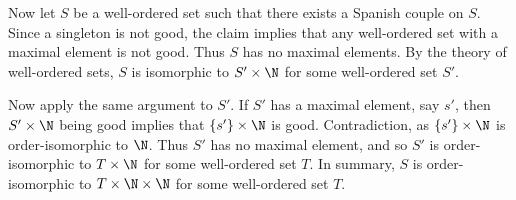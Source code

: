 Now let $S$ be a well-ordered set such that there exists a Spanish couple on $S$.
Since a singleton is not good, the claim implies that any well-ordered set with a maximal element is not good.
Thus $S$ has no maximal elements.
By the theory of well-ordered sets, $S$ is isomorphic to $S' \times \N$ for some well-ordered set $S'$.

Now apply the same argument to $S'$.
If $S'$ has a maximal element, say $s'$, then $S' \times \N$ being good implies that $\{s'\} \times \N$ is good.
Contradiction, as $\{s'\} \times \N$ is order-isomorphic to $\N$.
Thus $S'$ has no maximal element, and so $S'$ is order-isomorphic to $T \times \N$ for some well-ordered set $T$.
In summary, $S$ is order-isomorphic to $T \times \N \times \N$ for some well-ordered set $T$.
